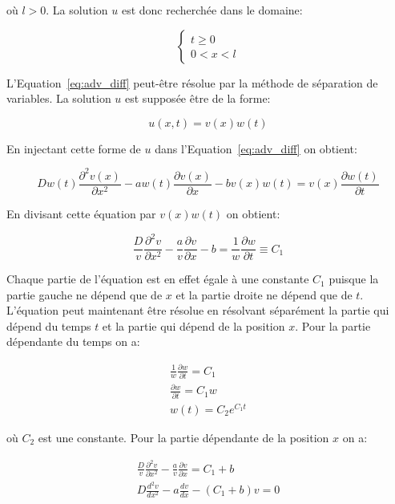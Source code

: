 \documentclass[a4paper, 12pt]{report}
\begin{document}
où $l > 0$. La solution $u$ est donc recherchée dans le domaine:

\begin{equation}
  \left \{
  \begin{aligned}
    t \ge 0\\
    0 < x < l
  \end{aligned}
  \right.
\end{equation}

L'Equation~\ref{eq:adv_diff} peut-être résolue par la méthode de séparation de
variables. La solution $u$ est supposée être de la forme:

\begin{equation}
  u(x,t) = v(x) w(t)
\end{equation}

En injectant cette forme de $u$ dans l'Equation~\ref{eq:adv_diff} on obtient:

\begin{equation}
D w(t) \frac{\partial^2 v(x)}{\partial x^2} - a w(t) \frac{\partial v(x)}{\partial x} - b v(x) w(t) = v(x) \frac{\partial w(t)}{\partial t}
\end{equation}

En divisant cette équation par $v(x) w(t)$ on obtient:

\begin{equation}
  \frac{D}{v} \frac{\partial^2 v}{\partial x^2} - \frac{a}{v} \frac{\partial v}{\partial x} -b = \frac{1}{w} \frac{\partial w}{\partial t} \equiv C_1
\end{equation}

Chaque partie de l'équation est en effet égale à une constante $C_1$ puisque
la partie gauche ne dépend que de $x$ et la partie droite ne dépend que de $t$.
L'équation peut maintenant être résolue en résolvant séparément la partie
qui dépend du temps $t$ et la partie qui dépend de la position $x$. Pour la
partie dépendante du temps on a:

\begin{align}
\frac{1}{w} \frac{\partial w}{\partial t} = C_1\\
\frac{\partial w}{\partial t} = C_1 w\\
w(t) = C_{2} e^{C_1 t}
\end{align}

où $C_{2}$ est une constante. Pour la partie dépendante de la position $x$
on a:

\begin{align}
  \frac{D}{v} \frac{\partial^2v}{\partial x^2} - \frac{a}{v} \frac{\partial v}{\partial x} = C_1 + b\\
  D \frac{d^2v}{d x^2} - a \frac{d v}{d x} - (C_1 + b) v = 0
\end{align}
\end{document}
